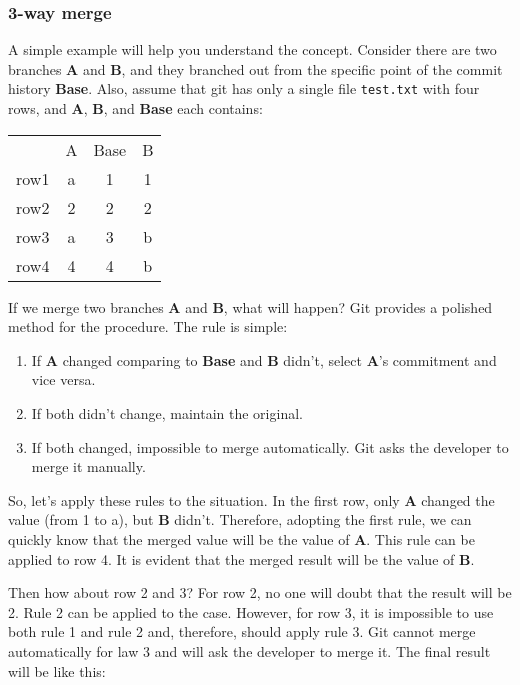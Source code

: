 \documentclass{oblivoir}
\begin{document}
\subsubsection{3-way merge}

A simple example will help you understand the concept. Consider there are two branches \textbf{A} and \textbf{B}, and they branched out from the specific point of the commit history \textbf{Base}. Also, assume that git has only a single file \texttt{test.txt} with four rows, and \textbf{A}, \textbf{B}, and \textbf{Base} each contains: 


\begin{center}
\begin{tabular}{c | c | c |c }
     & A & Base & B \\
row1 & a & 1    & 1 \\
row2 & 2 & 2    & 2 \\
row3 & a & 3    & b \\
row4 & 4 & 4    & b
\end{tabular}
\end{center}

If we merge two branches \textbf{A} and \textbf{B}, what will happen? Git provides a polished method for the procedure. The rule is simple:

\begin{enumerate}
    \item If \textbf{A} changed comparing to \textbf{Base} and \textbf{B} didn't, select \textbf{A}'s commitment and vice versa.
    \item If both didn't change, maintain the original. 
    \item If both changed, impossible to merge automatically. Git asks the developer to merge it manually.
\end{enumerate}

So, let's apply these rules to the situation. In the first row, only \textbf{A} changed the value (from 1 to a), but \textbf{B} didn't. Therefore, adopting the first rule, we can quickly know that the merged value will be the value of \textbf{A}. This rule can be applied to row 4. It is evident that the merged result will be the value of \textbf{B}. 

Then how about row 2 and 3? For row 2, no one will doubt that the result will be 2. Rule 2 can be applied to the case. However, for row 3, it is impossible to use both rule 1 and rule 2 and, therefore, should apply rule 3. Git cannot merge automatically for law 3 and will ask the developer to merge it. The final result will be like this:
\end{document}
